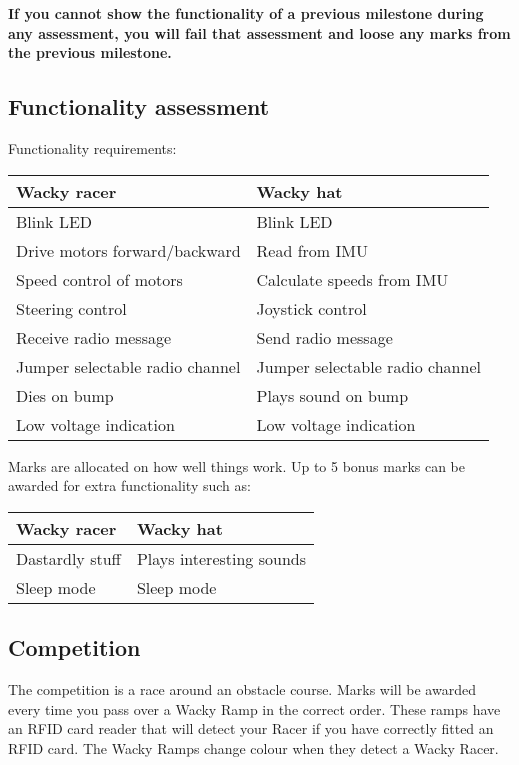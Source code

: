 \documentclass[11pt, a4paper]{article}
\begin{document}
\textbf{If you cannot show the functionality of a previous milestone
  during any assessment, you will fail that assessment and loose any
  marks from the previous milestone.}


\subsection{Functionality assessment}

Functionality requirements:
%
\begin{flushleft}
  \begin{tabular}{l|l}
    Wacky racer & Wacky hat \\ \hline \hline
    Blink LED                      & Blink LED \\
    Drive motors forward/backward  & Read from IMU \\
    Speed control of motors        & Calculate speeds from IMU \\
    Steering control               & Joystick control \\
    Receive radio message          & Send radio message \\
    Jumper selectable radio channel & Jumper selectable radio channel  \\    
    Dies on bump                   & Plays sound on bump \\
    Low voltage indication         & Low voltage indication \\
  \end{tabular}
\end{flushleft}
%
Marks are allocated on how well things work.  Up to 5 bonus marks can
be awarded for extra functionality such as:
%
\begin{flushleft}
  \begin{tabular}{l|l}
    Wacky racer                & Wacky hat \\ \hline \hline
    Dastardly stuff            & Plays interesting sounds \\
    Sleep mode                 & Sleep mode \\
  \end{tabular}
\end{flushleft}


\subsection{Competition}

The competition is a race around an obstacle course.  Marks will be
awarded every time you pass over a Wacky Ramp in the correct order.
These ramps have an RFID card reader that will detect your Racer if
you have correctly fitted an RFID card.  The Wacky Ramps change colour
when they detect a Wacky Racer.
\end{document}
